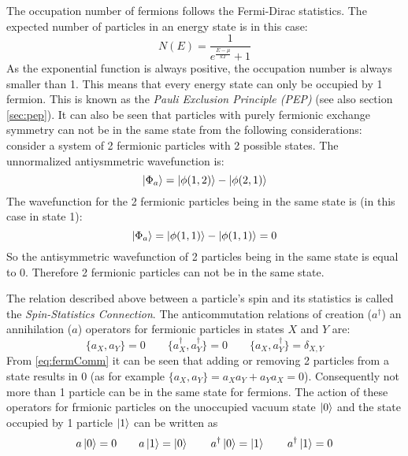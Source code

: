The occupation number of fermions follows the Fermi-Dirac statistics. The expected number of particles in an energy state is in this case:
\begin{equation}
 N(E) = \frac{1}{e^{\frac{E-\mu}{kT}}+1}
\end{equation} 
As the exponential function is always positive, the occupation number is always smaller than 1. This means that every energy state can only be occupied by 1 fermion. This is known as the \textit{Pauli Exclusion Principle (PEP)} (see also section \ref{sec:pep}). It can also be seen that particles with purely fermionic exchange symmetry can not be in the same state from the following considerations: consider a system of 2 fermionic particles with 2 possible states. The unnormalized antiysmmetric wavefunction is:
\begin{equation}
 \ket{\Phi_{a}} = \ket{\phi(1,2)} - \ket{\phi(2,1)} 
\end{equation} 
The wavefunction for the 2 fermionic particles being in the same state is (in this case in state 1):
\begin{equation}
 \ket{\Phi_{a}} = \ket{\phi(1,1)} - \ket{\phi(1,1)} = 0
\end{equation} 
So the antisymmetric wavefunction of 2 particles being in the same state is equal to 0. Therefore 2 fermionic particles can not be in the same state.

The relation described above between a particle's spin and its statistics is called the \textit{Spin-Statistics Connection}. The anticommutation relations of creation ($a^{\dag}$) an annihilation ($a$) operators for fermionic particles in states $X$ and $Y$ are:
\begin{equation}
\label{eq:fermComm}
 \{a_{X},a_{Y}\} = 0 \hspace{2em} \{a^{\dag}_{X},a^{\dag}_{Y}\} = 0 \hspace{2em} \{a_{X},a^{\dag}_{Y}\} = \delta_{X,Y}
\end{equation} 
From \ref{eq:fermComm} it can be seen that adding or removing 2 particles from a state results in 0 (as for example $\{a_{X},a_{Y}\} = a_{X}a_{Y} + a_{Y}a_{X} = 0$). Consequently not more than 1 particle can be in the same state for fermions. The action of these operators for frmionic particles on the unoccupied vacuum state $\ket{0}$ and the state occupied by 1 particle $\ket{1}$ can be written as
\begin{equation}
\label{eq:fermCreatAnnihOp}
 a \ket{0} = 0 \hspace{2em} a \ket{1} = \ket{0} \hspace{2em} a^{\dag} \ket{0} = \ket{1} \hspace{2em} a^{\dag} \ket{1} = 0
\end{equation} 

